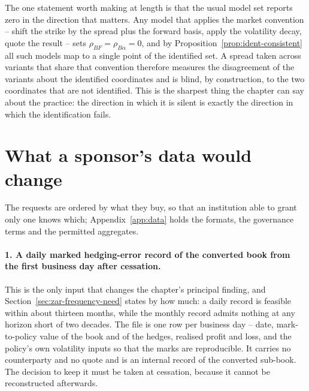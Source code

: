 \documentclass[../../../main.tex]{subfiles}
\begin{document}

The one statement worth making at length is that the usual model set reports zero in the direction that matters. Any model that applies the market convention -- shift the strike by the spread plus the forward basis, apply the volatility decay, quote the result -- sets $\rho_{BF}=\rho_{B\alpha}=0$, and by Proposition~\ref{prop:ident-consistent} all such models map to a single point of the identified set. A spread taken across variants that share that convention therefore measures the disagreement of the variants about the identified coordinates and is blind, by construction, to the two coordinates that are not identified. This is the sharpest thing the chapter can say about the practice: the direction in which it is silent is exactly the direction in which the identification fails.

\section{What a sponsor's data would change}\label{sec:zar-sponsor}

The requests are ordered by what they buy, so that an institution able to grant only one knows which; Appendix~\ref{app:data} holds the formats, the governance terms and the permitted aggregates.

\paragraph{1. A daily marked hedging-error record of the converted book from the first business day after cessation.} This is the only input that changes the chapter's principal finding, and Section~\ref{sec:zar-frequency-need} states by how much: a daily record is feasible within about thirteen months, while the monthly record admits nothing at any horizon short of two decades. The file is one row per business day -- date, mark-to-policy value of the book and of the hedges, realised profit and loss, and the policy's own volatility inputs so that the marks are reproducible. It carries no counterparty and no quote and is an internal record of the converted sub-book. The decision to keep it must be taken at cessation, because it cannot be reconstructed afterwards.
\end{document}
